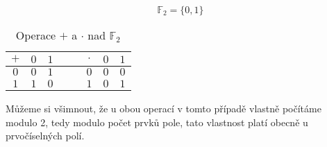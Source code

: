 \begin{example}
    $$\mathbb{F}_2 = \{0, 1\}$$
    \begin{table}[h]
        \centering
        \begin{tabular}{|c|c|l|l|l|c|c|l|}
        \hline
        $+$ & $0$ & $1$ &  &  & $\cdot$ & $0$ & $1$ \\ \hline
        $0$ & $0$ & $1$ &  &  & $0$     & $0$ & $0$ \\ \hline
        $1$ & $1$ & $0$ &  &  & $1$     & $0$ & $1$ \\ \hline
        \end{tabular}
        \caption{Operace $+$ a $\cdot$ nad $\mathbb{F}_{2}$}
        \label{tab:F2}
    \end{table}

    Můžeme si všimnout, že u obou operací v tomto případě vlastně počítáme modulo 2,
    tedy modulo počet prvků pole, tato vlastnost platí obecně u prvočíselných polí.
\end{example}



